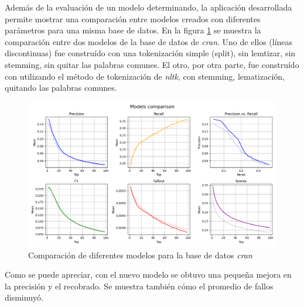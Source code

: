 Además de la evaluación de un modelo determinando, la aplicación desarrollada
permite mostrar una comparación entre modelos creados con diferentes
parámetros para una misma base de datos. En la figura \ref{fig:cran-comp} se muestra
la comparación entre dos modelos de la base de datos de \emph{cran}. Uno de ellos
(líneas discontinuas) fue construído con una tokenización simple (split), sin
lemtizar, sin stemming, sin quitar las palabras comunes. El otro, por otra parte,
fue construído con utilizando el método de tokenización de \emph{nltk}, con
stemming, lematización, quitando las palabras comunes.

\begin{figure}[htb]%
	\begin{center}
		\includegraphics[width=1.0\textwidth]{./cran_comp.png}
	\end{center}
	\caption{Comparación de diferentes modelos para la base de datos \emph{cran}}
	\label{fig:cran-comp}
\end{figure}

Como se puede apreciar, con el nuevo modelo se obtuvo una pequeña mejora en la
precisión y el recobrado. Se muestra también cómo el promedio de fallos disminuyó.
